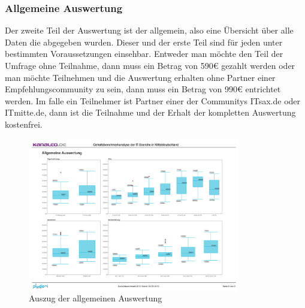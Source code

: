 \subsubsection{Allgemeine Auswertung}
Der zweite Teil der Auswertung ist der allgemein, also eine Übersicht über alle Daten die abgegeben wurden. Dieser und der erste Teil sind für jeden unter bestimmten Voraussetzungen einsehbar. Entweder man möchte den Teil der Umfrage ohne Teilnahme, dann muss ein Betrag von 590€ gezahlt werden oder man möchte Teilnehmen und die Auswertung erhalten ohne Partner einer Empfehlungscommunity zu sein, dann muss ein Betrag von 990€ entrichtet werden. Im falle ein Teilnehmer ist Partner einer der Communitys ITsax.de oder ITmitte.de, dann ist die Teilnahme und der Erhalt der kompletten Auswertung kostenfrei.
\newpage
\begin{figure}[htbp]
 \centering
 \includegraphics[width=350px]{./material/allgemeine_auswertung.png}
 \caption{Auszug der allgemeinen Auswertung}
 \label{fig:allg_auswertung}
\end{figure}
